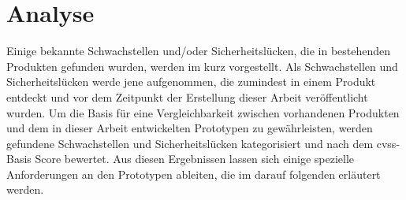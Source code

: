 \section{Analyse}
\label{sec:analysis}
	Einige bekannte Schwachstellen und/oder Sicherheitslücken, die in bestehenden Produkten gefunden wurden, werden im  kurz vorgestellt. 
	Als Schwachstellen und Sicherheitslücken werde jene aufgenommen, die zumindest in einem Produkt entdeckt und vor dem Zeitpunkt der Erstellung dieser Arbeit veröffentlicht wurden. 
	Um die Basis für eine Vergleichbarkeit zwischen vorhandenen Produkten und dem in dieser Arbeit entwickelten Prototypen zu gewährleisten, werden gefundene Schwachstellen und Sicherheitslücken kategorisiert und nach dem \gls{cvss}-Basis Score bewertet.
	Aus diesen Ergebnissen lassen sich einige spezielle Anforderungen an den Prototypen ableiten, die im darauf folgenden   erläutert werden.
